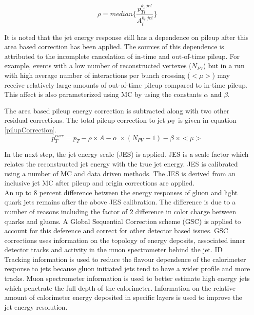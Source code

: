 \begin{equation}
\rho=median\{ \frac{p_{T i}^{k_t~jet}}{A_i^{k_t~jet}} \}
\label{eqn:PileupDensity}
\end{equation}

\indent  It is noted that the jet energy response still has a dependence on pileup after this area based correction has been applied.  The sources of this dependence is attributed to the incomplete cancelation of in-time and out-of-time pileup.\cite{JetCalibartion13TeV}  For example, events with a low number of reconstructed vertexes ($N_{PV}$) but in a run with high average number of interactions per bunch crossing ($<\mu>$) may receive relatively large amounts of out-of-time pileup compared to in-time pileup.  This affect is also parameterized using MC by using the constants $\alpha$ and $\beta$.  

\indent The area based pileup energy correction is subtracted along with two other residual corrections.  The total pileup correction to jet $p_{\mathrm{T}}$ is given in equation \ref{pilupCorrection}. \\

\begin{equation}
p_T^{corr} = p_T - \rho \times A - \alpha~\times (N_{PV} - 1 ) - \beta~\times <\mu>
\label{eqn:pilupCorrection}
\end{equation}

\indent In the next step, the jet energy scale (JES) is applied.  JES is a scale factor which relates the reconstructed jet energy with the true jet energy.  JES is calibrated using a number of MC and data driven methods.  The JES is derived from an inclusive jet MC after pileup and origin corrections are applied.  \\

\indent An up to 8 percent difference between the energy responses of gluon and light quark jets remains after the above JES calibration.\cite{JetCalibartion13TeV}  The difference is due to a number of reasons including the factor of 2 difference in color charge between quarks and gluons.  A Global Sequential Correction scheme (GSC) is applied to account for this deference and correct for other detector based issues.\cite{jet_GSC}  GSC corrections uses information on the topology of energy deposits, associated inner detector tracks and activity in the muon spectrometer behind the jet.  ID Tracking information is used to reduce the flavour dependence of the calorimeter response to jets because gluon initiated jets tend to have a wider profile and more tracks. Muon spectrometer information is used to better estimate high energy jets which penetrate the full depth of the calorimeter.  Information on the relative amount of calorimeter energy deposited in specific layers is used to improve the jet energy resolution. \\

